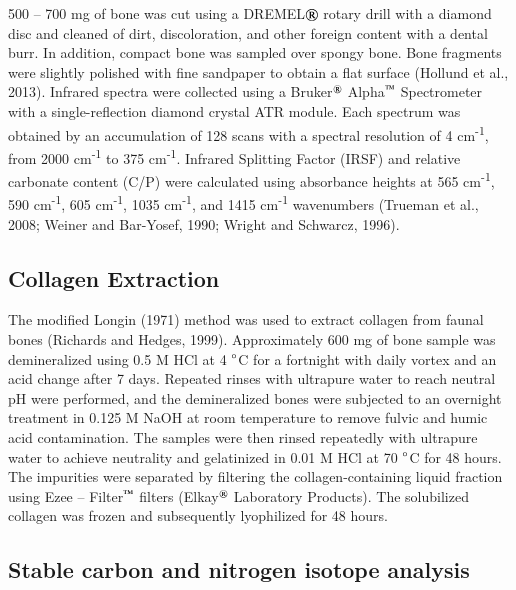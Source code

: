 \documentclass[3p]{elsarticle} %
\begin{document}
500 -- 700 mg of bone was cut using a DREMEL\(\text{\textregistered}\) rotary drill with a diamond disc and cleaned of dirt, discoloration, and other foreign content with a dental burr. In addition, compact bone was sampled over spongy bone. Bone fragments were slightly polished with fine sandpaper to obtain a flat surface (Hollund et al., 2013). Infrared spectra were collected using a Bruker\(^\text{\textregistered}\) Alpha\(^\text{\texttrademark}\) Spectrometer with a single-reflection diamond crystal ATR module. Each spectrum was obtained by an accumulation of 128 scans with a spectral resolution of 4 cm\textsuperscript{-1}, from 2000 cm\textsuperscript{-1} to 375 cm\textsuperscript{-1}. Infrared Splitting Factor (IRSF) and relative carbonate content (C/P) were calculated using absorbance heights at 565 cm\textsuperscript{-1}, 590 cm\textsuperscript{-1}, 605 cm\textsuperscript{-1}, 1035 cm\textsuperscript{-1}, and 1415 cm\textsuperscript{-1} wavenumbers (Trueman et al., 2008; Weiner and Bar-Yosef, 1990; Wright and Schwarcz, 1996).

\hypertarget{collagen-extraction}{%
\subsection{Collagen Extraction}\label{collagen-extraction}}

The modified Longin (1971) method was used to extract collagen from faunal bones (Richards and Hedges, 1999). Approximately 600 mg of bone sample was demineralized using 0.5 M HCl at 4 \(\text{\textdegree}\)C for a fortnight with daily vortex and an acid change after 7 days. Repeated rinses with ultrapure water to reach neutral pH were performed, and the demineralized bones were subjected to an overnight treatment in 0.125 M NaOH at room temperature to remove fulvic and humic acid contamination. The samples were then rinsed repeatedly with ultrapure water to achieve neutrality and gelatinized in 0.01 M HCl at 70 \(\text{\textdegree}\)C for 48 hours. The impurities were separated by filtering the collagen-containing liquid fraction using Ezee -- Filter\(^\text{\texttrademark}\) filters (Elkay\(^\text{\textregistered}\) Laboratory Products). The solubilized collagen was frozen and subsequently lyophilized for 48 hours.

\hypertarget{stable-carbon-and-nitrogen-isotope-analysis}{%
\subsection{Stable carbon and nitrogen isotope analysis}\label{stable-carbon-and-nitrogen-isotope-analysis}}
\end{document}
